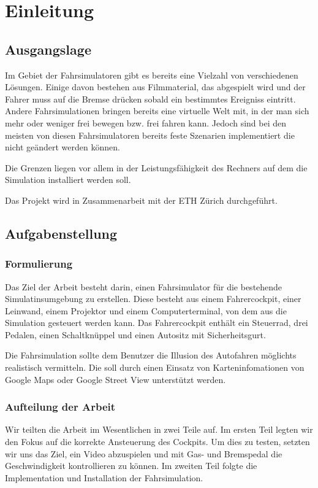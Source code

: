 \section{Einleitung}
\subsection{Ausgangslage}

Im Gebiet der Fahrsimulatoren gibt es bereits eine Vielzahl von verschiedenen Lösungen. Einige davon bestehen aus Filmmaterial, das abgespielt wird und der Fahrer muss auf die Bremse drücken sobald ein bestimmtes Ereigniss eintritt. Andere Fahrsimulationen bringen bereits eine virtuelle Welt mit, in der man sich mehr oder weniger frei bewegen bzw. frei fahren kann. Jedoch sind bei den meisten von diesen Fahrsimulatoren bereits feste Szenarien implementiert die  nicht geändert werden können.

Die Grenzen liegen vor allem in der Leistungsfähigkeit des Rechners auf dem die Simulation installiert werden soll.

Das Projekt wird in Zusammenarbeit mit der ETH Zürich durchgeführt.


\subsection{Aufgabenstellung}
\subsubsection{Formulierung}

Das Ziel der Arbeit besteht darin, einen Fahrsimulator für die bestehende Simulatinsumgebung zu erstellen. Diese besteht aus einem Fahrercockpit, einer Leinwand, einem Projektor und einem Computerterminal, von dem aus die Simulation gesteuert werden kann. Das Fahrercockpit enthält ein Steuerrad, drei Pedalen, einen Schaltknüppel und einen Autositz mit Sicherheitsgurt.

Die Fahrsimulation sollte dem Benutzer die Illusion des Autofahren möglichts realistisch vermitteln. Die soll durch einen Einsatz von Karteninfomationen von Google Maps oder Google Street View unterstützt werden. 


\subsubsection{Aufteilung der Arbeit}
Wir teilten die Arbeit im Wesentlichen in zwei Teile auf. Im ersten Teil legten wir den Fokus auf die korrekte Ansteuerung des Cockpits. Um dies zu testen, setzten wir uns das Ziel, ein Video abzuspielen und mit Gas- und Bremspedal die Geschwindigkeit kontrollieren zu können. Im zweiten Teil folgte die Implementation und Installation der Fahrsimulation.

